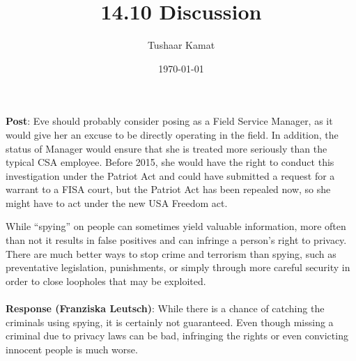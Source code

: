 \documentclass{article}
\author{Tushaar Kamat}
\title{14.10 Discussion}
\date{\today}
\begin{document}
\maketitle

\textbf{Post}: Eve should probably consider posing as a Field Service Manager, as it would give
her an excuse to be directly operating in the field. In addition, the status of
Manager would ensure that she is treated more seriously than the typical CSA
employee. Before 2015, she would have the right to conduct this investigation
under the Patriot Act and could have submitted a request for a warrant to a FISA
court, but the Patriot Act has been repealed now, so she might have to act
under the new USA Freedom act. 

While ``spying'' on people can sometimes yield valuable information, more often
than not it results in false positives and can infringe a person's right to
privacy. There are much better ways to stop crime and terrorism than spying,
such as preventative legislation, punishments, or simply through more careful
security in order to close loopholes that may be exploited. 
\\
\\
\textbf{Response (Franziska Leutsch)}: While there is a chance of catching the
criminals using spying, it is certainly not guaranteed. Even though missing a
criminal due to privacy laws can be bad, infringing the rights or even
convicting innocent people is much worse. 
\end{document}
